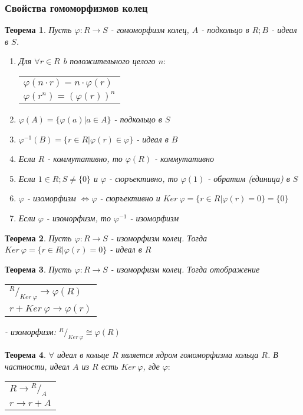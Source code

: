 \documentclass[10pt,a4paper]{article}
\newtheorem{theorem}{Теорема}
\begin{document}
			\subsubsection{Свойства гомоморфизмов колец}
				\begin{theorem}
					Пусть $\varphi: R \to S$ - гомоморфизм колец, $A$ - подкольцо в $R; B$ - идеал в $S$.
					\begin{enumerate}
						\item Для $\forall r \in R$ b положительного целого $n:$
							\begin{tabular}{l}
								$\varphi(n \cdot r) = n \cdot \varphi(r)$\\
								$\varphi(r^n) = (\varphi(r))^n$
							\end{tabular}
						\item $\varphi(A) = \{\varphi(a) \big| a \in A\}$ - подкольцо в $S$
						\item $\varphi^{-1}(B) = \{r \in R \big| \varphi(r) \in \varphi\}$ - идеал в $B$
						\item Если $R$ - коммутативно, то $\varphi(R)$ - коммутативно
						\item Если $1 \in R; S \neq \{0\}$ и $\varphi$ - сюръективно, то $\varphi(1)$ - обратим (единица) в $S$
						\item $\varphi$ - изоморфизм $\Leftrightarrow \varphi$ - сюръективно и $Ker\ \varphi = \{r \in R \big| \varphi(r) = 0\} = \{0\}$
						\item Если $\varphi$ - изоморфизм, то $\varphi^{-1}$ - изоморфизм
					\end{enumerate}
				\end{theorem}
				\begin{theorem}
					Пусть $\varphi: R \to S$ - изоморфизм колец. Тогда $Ker\ \varphi = \{r \in R \big| \varphi(r) = 0\}$ - идеал в $R$
				\end{theorem}
				\begin{theorem}
					Пусть $\varphi: R \to S$ - изоморфизм колец. Тогда отображение
					\begin{tabular}{l}
						${}^R/_{Ker\ \varphi} \to \varphi(R)$\\
						$r + Ker\ \varphi \to \varphi(r)$
					\end{tabular}
					- изоморфизм: ${}^R/_{Ker\ \varphi} \cong \varphi(R)$
				\end{theorem}
				\begin{theorem}
					$\forall$ идеал в кольце $R$ является ядром гомоморфизма кольца $R$. В частности, идеал $A$ из $R$ есть $Ker\ \varphi$, где $\varphi:$
					\begin{tabular}{l}
						$R \to {}^R/_A$\\
						$r \to r+A$
					\end{tabular}
				\end{theorem}
\end{document}
